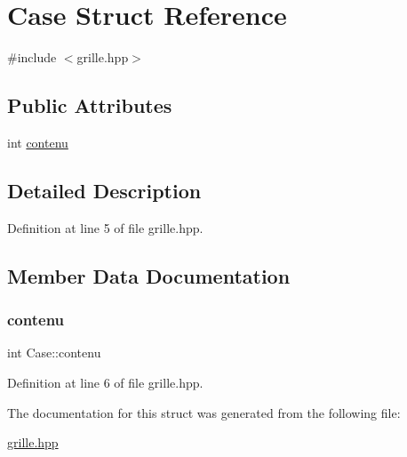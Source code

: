 \hypertarget{structCase}{}\section{Case Struct Reference}
\label{structCase}


{\ttfamily \#include $<$grille.\+hpp$>$}

\subsection*{Public Attributes}
\begin{DoxyCompactItemize}
\item 
int \hyperlink{structCase_ad8be9d40ff661cb70e6aeced51cf0b5c}{contenu}
\end{DoxyCompactItemize}


\subsection{Detailed Description}


Definition at line 5 of file grille.\+hpp.



\subsection{Member Data Documentation}
\mbox{\label{structCase_ad8be9d40ff661cb70e6aeced51cf0b5c}} 
\subsubsection{\texorpdfstring{contenu}{contenu}}
{\footnotesize\ttfamily int Case\+::contenu}



Definition at line 6 of file grille.\+hpp.



The documentation for this struct was generated from the following file\+:\begin{DoxyCompactItemize}
\item 
\hyperlink{grille_8hpp}{grille.\+hpp}\end{DoxyCompactItemize}
